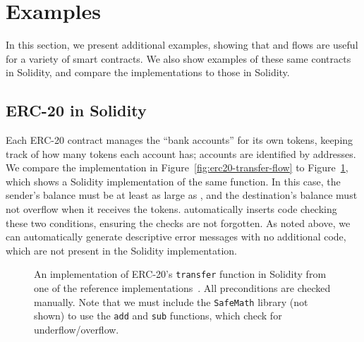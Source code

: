 \documentclass[nonacm, dvipsnames, sigconf]{acmart}
\begin{document}


\section{Examples}

In this section, we present additional examples, showing that \langName and flows are useful for a variety of smart contracts.
We also show examples of these same contracts in Solidity, and compare the \langName implementations to those in Solidity.

\subsection{ERC-20 in Solidity}\label{sec:erc20-impl}
Each ERC-20 contract manages the ``bank accounts'' for its own tokens, keeping track of how many tokens each account has; accounts are identified by addresses.
We compare the \langName implementation in Figure~\ref{fig:erc20-transfer-flow} to Figure~\ref{fig:erc20-transfer-sol}, which shows a Solidity implementation of the same function.
In this case, the sender's balance must be at least as large as , and the destination's balance must not overflow when it receives the tokens.
\langName automatically inserts code checking these two conditions, ensuring the checks are not forgotten.
As noted above, we can automatically generate descriptive error messages with no additional code, which are not present in the Solidity implementation.
\begin{figure}
    \centering
    
    \caption{An implementation of ERC-20's \lstinline[language=Solidity]{transfer} function in Solidity from one of the reference implementations~\cite{erc20Consensys}.
        All preconditions are checked manually.
        Note that we must include the \lstinline[language=Solidity]{SafeMath} library (not shown) to use the \lstinline[language=Solidity]{add} and \lstinline[language=Solidity]{sub} functions, which check for underflow/overflow.}
    \label{fig:erc20-transfer-sol}
\end{figure}
\end{document}
